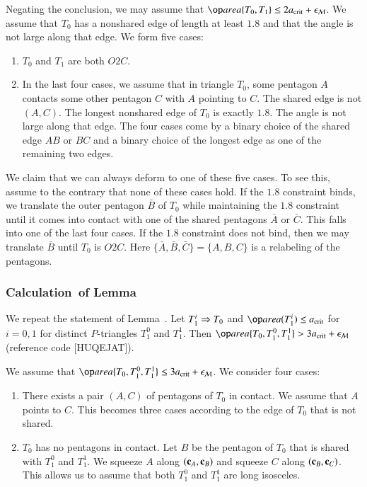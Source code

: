 Negating the conclusion, we may assume that $\area\{T_0,T_1\}\le
2\acrit + \epsM$.  We assume that $T_0$ has a nonshared edge of length
at least $1.8$ and that the angle is not large along that edge.  We
form five cases:
\begin{enumerate}  
\item $T_0$ and $T_1$ are both $O2C$.
\item In the last four cases, we assume that in triangle $T_0$, some
  pentagon $A$ contacts some other pentagon $C$ with $A$ pointing to
  $C$.  The shared edge is not $(A,C)$. The longest nonshared edge of
  $T_0$ is exactly $1.8$.  The angle is not large along that edge.
  The four cases come by a binary choice of the shared edge $AB$ or
  $BC$ and a binary choice of the longest edge as one of the remaining
  two edges.
\end{enumerate}

We claim that we can always deform to one of these five cases.  To see
this, assume to the contrary that none of these cases hold.  If the
$1.8$ constraint binds, we translate the outer pentagon $\bar B$ of
$T_0$ while maintaining the $1.8$ constraint until it comes into
contact with one of the shared pentagons $\bar A$ or $\bar C$. This
falls into one of the last four cases.  If the $1.8$ constraint does
not bind, then we may translate $\bar B$ until $T_0$ is $O2C$.  Here
$\{\bar A,\bar B,\bar C\}=\{A,B,C\}$ is a relabeling of the pentagons.

\subsubsection{Calculation~of Lemma~}\label{sec:pent3} %

We repeat the statement of Lemma~.  Let $T_1^i\Rightarrow T_0$
and $\area(T_1^i)\le\acrit$ for $i=0,1$ for distinct $P$-triangles
$T_1^0$ and $T_1^1$.  Then $\area\{T_0,T_1^0,T_1^1\} > 3\acrit +
\epsM$ (reference code [HUQEJAT]).

We assume that $\area\{T_0,T_1^0,T_1^1\}\le 3\acrit + \epsM$.  We
consider four cases:
\begin{enumerate}  
\item There exists a pair $(A,C)$ of pentagons of $T_0$ in contact.
  We assume that $A$ points to $C$.  This becomes three cases
  according to the edge of $T_0$ that is not shared.
\item $T_0$ has no pentagons in contact. Let $B$ be
  the pentagon of $T_0$ that is shared with $T_1^0$ and $T_1^1$.  We
  squeeze $A$ along $({\mathbf c}_A,{\mathbf c}_B)$ and squeeze $C$ along $({\mathbf c}_B,{\mathbf c}_C)$.
  This allows us to assume that both $T_1^0$ and $T_1^1$ are long
  isosceles.
\end{enumerate}  

